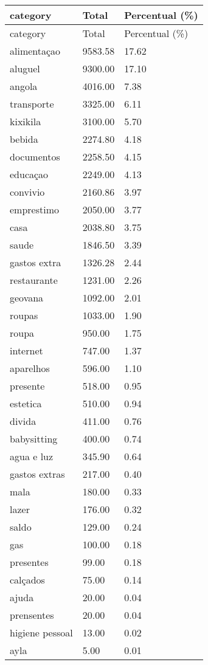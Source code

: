 \documentclass[
  8pt,
  a4paper,
  DIV=11,
  numbers=noendperiod]{scrartcl}
\begin{document}
\begin{figure}
\begin{minipage}{0.50\linewidth}
\begin{longtable}[]{@{}lll@{}}
\caption{}\label{T_ae836}\tabularnewline
\toprule\noalign{}
category & Total & Percentual (\%) \\
\midrule\noalign{}
\endfirsthead
\toprule\noalign{}
category & Total & Percentual (\%) \\
\midrule\noalign{}
\endhead
\bottomrule\noalign{}
\endlastfoot
alimentaçao & 9583.58 & 17.62 \\
aluguel & 9300.00 & 17.10 \\
angola & 4016.00 & 7.38 \\
transporte & 3325.00 & 6.11 \\
kixikila & 3100.00 & 5.70 \\
bebida & 2274.80 & 4.18 \\
documentos & 2258.50 & 4.15 \\
educaçao & 2249.00 & 4.13 \\
convivio & 2160.86 & 3.97 \\
emprestimo & 2050.00 & 3.77 \\
casa & 2038.80 & 3.75 \\
saude & 1846.50 & 3.39 \\
gastos extra & 1326.28 & 2.44 \\
restaurante & 1231.00 & 2.26 \\
geovana & 1092.00 & 2.01 \\
roupas & 1033.00 & 1.90 \\
roupa & 950.00 & 1.75 \\
internet & 747.00 & 1.37 \\
aparelhos & 596.00 & 1.10 \\
presente & 518.00 & 0.95 \\
estetica & 510.00 & 0.94 \\
divida & 411.00 & 0.76 \\
babysitting & 400.00 & 0.74 \\
agua e luz & 345.90 & 0.64 \\
gastos extras & 217.00 & 0.40 \\
mala & 180.00 & 0.33 \\
lazer & 176.00 & 0.32 \\
saldo & 129.00 & 0.24 \\
gas & 100.00 & 0.18 \\
presentes & 99.00 & 0.18 \\
calçados & 75.00 & 0.14 \\
ajuda & 20.00 & 0.04 \\
prensentes & 20.00 & 0.04 \\
higiene pessoal & 13.00 & 0.02 \\
ayla & 5.00 & 0.01 \\
\end{longtable}


\end{minipage}
\end{figure}
\end{document}
